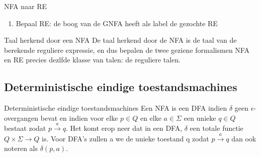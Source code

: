\begin{alg}[NFA $\to$ RE]{NFA naar RE}
\begin{enumerate}
\begin{center}
                \end{center}
        \item Bepaal RE: de boog van de GNFA heeft als label de gezochte RE
    \end{enumerate}
\end{alg}

\begin{lem}{Taal herkend door een NFA}
    De taal herkend door de NFA is de taal van de berekende reguliere expressie, en dus bepalen de twee geziene formalismen NFA en RE precies dezlfde klasse van talen: de reguliere talen.
\end{lem}   

\subsection{Deterministische eindige toestandsmachines}

\vspace{0.5cm}

\begin{theo}{Deterministische eindige toestandsmachines}
    Een NFA is een DFA indien \(\delta\) geen \(\epsilon\)-overgangen bevat en 
    indien voor elke \(p \in Q\) en elke \(a \in \Sigma\) een unieke \(q \in Q\) 
    bestaat zodat \(p \overset{a}{\to} q\). Het komt erop neer dat in een DFA, \(\delta\) 
    een totale functie $Q \times \Sigma \to Q$ is. Voor DFA's zullen a
    we de unieke toestand q zodat \(p \overset{a}{\to} q\) dan ook noteren als \(\delta(p,a)\).
\end{theo}

\newpage

